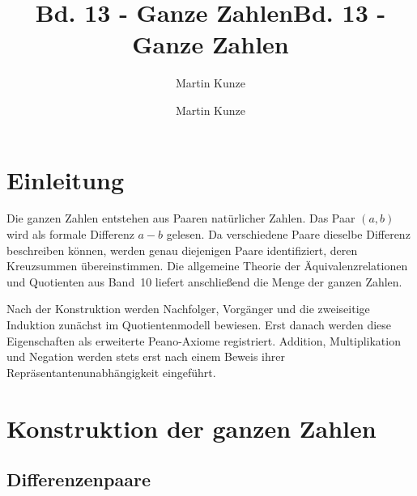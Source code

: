 \documentclass[main.tex]{subfiles}
\title{Bd. 13 - Ganze Zahlen}
\author{Martin Kunze}
\date{}
\begin{document}
\title{Bd. 13 - Ganze Zahlen}
\author{Martin Kunze}
\date{}
\hypersetup{pageanchor=false}
\maketitle
\hypersetup{pageanchor=true}
\setcounter{tocdepth}{3}
\tableofcontents
\setcounter{file}{13}
\renewcommand{\FormulaBandID}{13}

\chapter{Einleitung}

Die ganzen Zahlen entstehen aus Paaren natürlicher Zahlen. Das Paar
\((a,b)\) wird als formale Differenz \(a-b\) gelesen. Da verschiedene Paare
dieselbe Differenz beschreiben können, werden genau diejenigen Paare
identifiziert, deren Kreuzsummen übereinstimmen. Die allgemeine Theorie der
Äquivalenzrelationen und Quotienten aus Band~10 liefert anschließend die
Menge der ganzen Zahlen.

Nach der Konstruktion werden Nachfolger, Vorgänger und die zweiseitige
Induktion zunächst im Quotientenmodell bewiesen. Erst danach werden diese
Eigenschaften als erweiterte Peano-Axiome registriert. Addition,
Multiplikation und Negation werden stets erst nach einem Beweis ihrer
Repräsentantenunabhängigkeit eingeführt.

\chapter{Konstruktion der ganzen Zahlen}

\section{Differenzenpaare}



\begin{tabproof}
\end{tabproof}
\end{document}
